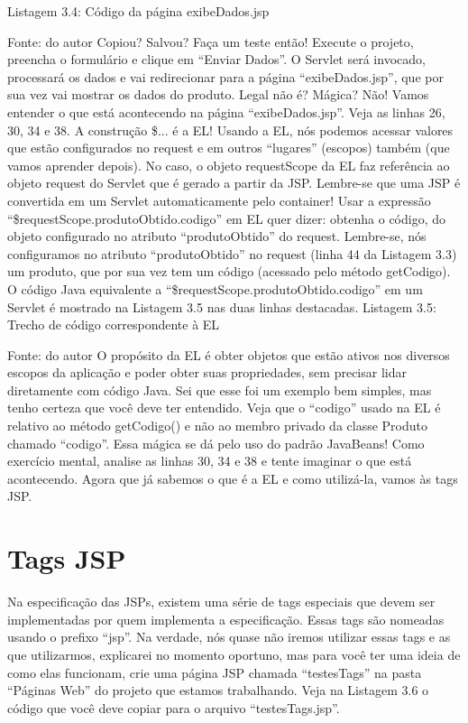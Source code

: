 Listagem 3.4: Código da página exibeDados.jsp
 
Fonte: do autor
Copiou? Salvou? Faça um teste então! Execute o projeto, preencha o formulário e clique em “Enviar Dados”. O Servlet será invocado, processará os dados e vai redirecionar para a página “exibeDados.jsp”, que por sua vez vai mostrar os dados do produto. Legal não é? Mágica? Não! Vamos entender o que está acontecendo na página “exibeDados.jsp”. Veja as linhas 26, 30, 34 e 38. A construção \${...} é a EL! Usando a EL, nós podemos acessar valores que estão configurados no request e em outros “lugares” (escopos) também (que vamos aprender depois). No caso, o objeto requestScope da EL faz referência ao objeto request do Servlet que é gerado a partir da JSP. Lembre-se que uma JSP é convertida em um Servlet automaticamente pelo container!
Usar a expressão “\${requestScope.produtoObtido.codigo}” em EL quer dizer: obtenha o código, do objeto configurado no atributo “produtoObtido” do request. Lembre-se, nós configuramos no atributo “produtoObtido” no request (linha 44 da Listagem 3.3) um produto, que por sua vez tem um código (acessado pelo método getCodigo). O código Java equivalente a “\${requestScope.produtoObtido.codigo}” em um Servlet é mostrado na Listagem 3.5 nas duas linhas destacadas.
Listagem 3.5: Trecho de código correspondente à EL
 
Fonte: do autor
O propósito da EL é obter objetos que estão ativos nos diversos escopos da aplicação e poder obter suas propriedades, sem precisar lidar diretamente com código Java. Sei que esse foi um exemplo bem simples, mas tenho certeza que você deve ter entendido. Veja que o “codigo” usado na EL é relativo ao método getCodigo() e não ao membro privado da classe Produto chamado “codigo”. Essa mágica se dá pelo uso do padrão JavaBeans! Como exercício mental, analise as linhas 30, 34 e 38 e tente imaginar o que está acontecendo. Agora que já sabemos o que é a EL e como utilizá-la, vamos às tags JSP.


\section{Tags JSP}

Na especificação das JSPs, existem uma série de tags especiais que devem ser implementadas por quem implementa a especificação. Essas tags são nomeadas usando o prefixo “jsp”. Na verdade, nós quase não iremos utilizar essas tags e as que utilizarmos, explicarei no momento oportuno, mas para você ter uma ideia de como elas funcionam, crie uma página JSP chamada “testesTags” na pasta “Páginas Web” do projeto que estamos trabalhando. Veja na Listagem 3.6 o código que você deve copiar para o arquivo “testesTags.jsp”. 



